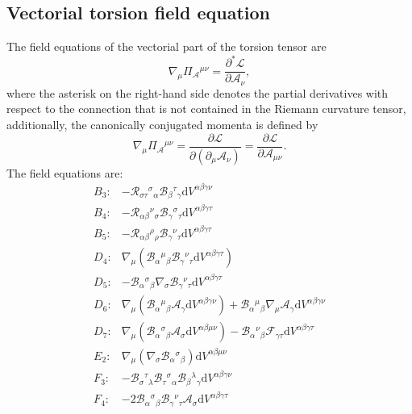 \documentclass{article}
\providecommand{\Rie}[3]{\mathcal{R}_{#1}{}^{ #2}{}_{#3}}
\providecommand{\B}[3]{\mathcal{B}_{#1}{}^{ #2}{}_{#3}}
\providecommand{\A}[1]{\mathcal{A}_{#1}}
\providecommand{\deV}[1]{\mathrm{d}V^{#1}}
\begin{document}
\subsection{Vectorial torsion field equation}

The field equations of the vectorial part of the torsion tensor are
\begin{equation}
    \nabla_\mu \Pi_{\mathcal{A}}{}^{\mu\nu}  = \frac{\partial^* \mathcal{L}}{\partial \A{\nu}},
\end{equation}
where the asterisk on the right-hand side denotes the partial derivatives with respect to the connection that is not
contained in the Riemann curvature tensor, additionally, the canonically conjugated momenta is defined by
\begin{equation}
    \nabla_\mu \Pi_{\mathcal{A}}{}^{\mu\nu}  
    = \frac{\partial \mathcal{L}}{\partial \left(\partial_\mu \A{\nu}\right)} 
    = \frac{\partial \mathcal{L}}{\partial \A{\mu\nu}}.
\end{equation}
The field equations are:
\begin{align*}
    B_3: & -\Rie{\sigma\tau}{\sigma}{\alpha}\B{\beta}{\tau}{\gamma}\deV{\alpha\beta\gamma\nu} \\
    B_4: & -\Rie{\alpha\beta}{\nu}{\sigma}\B{\gamma}{\sigma}{\tau}\deV{\alpha\beta\gamma\tau} \\
    B_5: & -\Rie{\alpha\beta}{\rho}{\rho}\B{\gamma}{\nu}{\tau}\deV{\alpha\beta\gamma\tau} \\
    D_4: & \nabla_\mu\left(\B{\alpha}{\mu}{\beta}\B{\gamma}{\nu}{\tau}\deV{\alpha\beta\gamma\tau}\right) \\
    D_5: & -\B{\alpha}{\sigma}{\beta}\nabla_\sigma\B{\gamma}{\nu}{\tau}\deV{\alpha\beta\gamma\tau} \\
    D_6: & \nabla_\mu\left(\B{\alpha}{\mu}{\beta}\A{\gamma}\deV{\alpha\beta\gamma\nu}\right) + \B{\alpha}{\mu}{\beta}\nabla_\mu\A{\gamma}\deV{\alpha\beta\gamma\nu} \\
    D_7: & \nabla_\mu\left(\B{\alpha}{\sigma}{\beta}\A{\sigma}\deV{\alpha\beta\mu\nu}\right) - \B{\alpha}{\nu}{\beta}\mathcal{F}_{\gamma\tau}\deV{\alpha\beta\gamma\tau} \\
    E_2: & \nabla_\mu \left(\nabla_\sigma\B{\alpha}{\sigma}{\beta}\right)\deV{\alpha\beta\mu\nu}\\
    F_3: & -\B{\sigma}{\tau}{\lambda}\B{\tau}{\sigma}{\alpha}\B{\beta}{\lambda}{\gamma}\deV{\alpha\beta\gamma\nu}\\
    F_4: & -2\B{\alpha}{\sigma}{\beta}\B{\gamma}{\nu}{\tau}\A{\sigma}\deV{\alpha\beta\gamma\tau} 
\end{align*}
\end{document}

